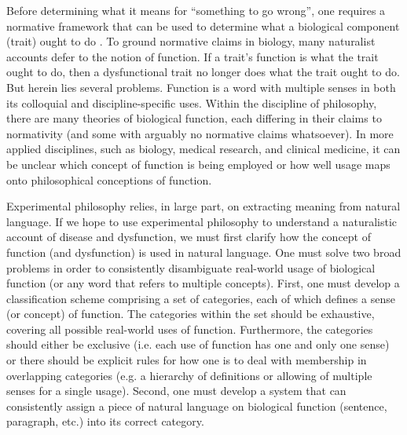 \documentclass{article}
\begin{document}
Before determining what it means for ``something to go wrong'', one requires a normative framework that can be used to determine what a biological component (trait) ought to do  .
To ground normative claims in biology, many naturalist accounts defer to the notion of function.
If a trait's function is what the trait ought to do, then a dysfunctional trait no longer does what the trait ought to do.
But herein lies several problems.
Function is a word with multiple senses in both its colloquial and discipline-specific uses.
Within the discipline of philosophy, there are many theories of biological function, each differing in their claims to normativity (and some with arguably no normative claims whatsoever).
In more applied disciplines, such as biology, medical research, and clinical medicine, it can be unclear which concept of function is being employed or how well usage maps onto philosophical conceptions of function.

Experimental philosophy relies, in large part, on extracting meaning from natural language.
If we hope to use experimental philosophy to understand a naturalistic account of disease and dysfunction, we must first clarify how the concept of function (and dysfunction) is used in natural language.
One must solve two broad problems in order to consistently disambiguate real-world usage of biological function (or any word that refers to multiple concepts).
First, one must develop a classification scheme comprising a set of categories, each of which defines a sense (or concept) of function.
The categories within the set should be exhaustive, covering all possible real-world uses of function.
Furthermore, the categories should either be exclusive (i.e. each use of function has one and only one sense) or there should be explicit rules for how one is to deal with membership in overlapping categories (e.g. a hierarchy of definitions or allowing of multiple senses for a single usage). 
Second, one must develop a system that can consistently assign a piece of natural language on biological function (sentence, paragraph, etc.) into its correct category.
\end{document}
